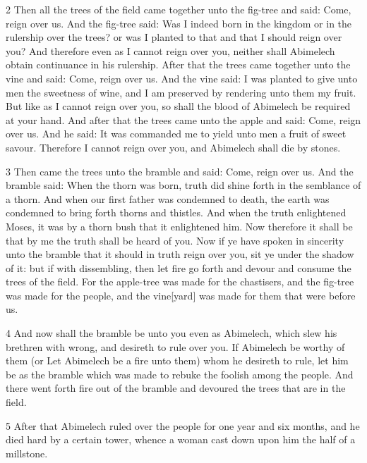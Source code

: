 \par 2 Then all the trees of the field came together unto the fig-tree and said: Come, reign over us. And the fig-tree said: Was I indeed born in the kingdom or in the rulership over the trees? or was I planted to that and that I should reign over you? And therefore even as I cannot reign over you, neither shall Abimelech obtain continuance in his rulership. After that the trees came together unto the vine and said: Come, reign over us. And the vine said: I was planted to give unto men the sweetness of wine, and I am preserved by rendering unto them my fruit. But like as I cannot reign over you, so shall the blood of Abimelech be required at your hand. And after that the trees came unto the apple and said: Come, reign over us. And he said: It was commanded me to yield unto men a fruit of sweet savour. Therefore I cannot reign over you, and Abimelech shall die by stones. 

\par 3 Then came the trees unto the bramble and said: Come, reign over us. And the bramble said: When the thorn was born, truth did shine forth in the semblance of a thorn. And when our first father was condemned to death, the earth was condemned to bring forth thorns and thistles. And when the truth enlightened Moses, it was by a thorn bush that it enlightened him. Now therefore it shall be that by me the truth shall be heard of you. Now if ye have spoken in sincerity unto the bramble that it should in truth reign over you, sit ye under the shadow of it: but if with dissembling, then let fire go forth and devour and consume the trees of the field. For the apple-tree was made for the chastisers, and the fig-tree was made for the people, and the vine[yard] was made for them that were before us.

\par 4 And now shall the bramble be unto you even as Abimelech, which slew his brethren with wrong, and desireth to rule over you. If Abimelech be worthy of them (or Let Abimelech be a fire unto them) whom he desireth to rule, let him be as the bramble which was made to rebuke the foolish among the people. And there went forth fire out of the bramble and devoured the trees that are in the field.

\par 5 After that Abimelech ruled over the people for one year and six months, and he died hard by a certain tower, whence a woman cast down upon him the half of a millstone.

\par [A gap of uncertain length in the text.]


